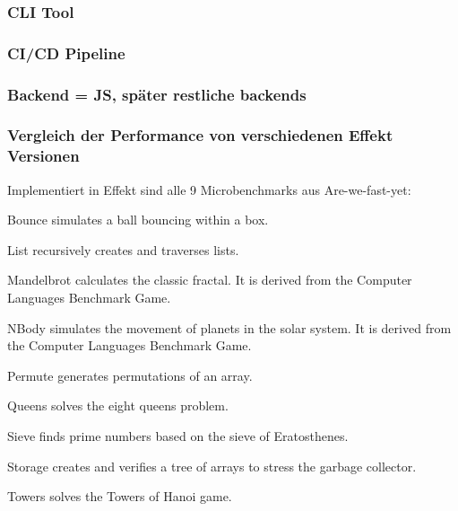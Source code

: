\subsubsection{ CLI Tool }
\subsubsection{CI/CD Pipeline }
\subsubsection{ Backend = JS, später restliche backends }
\subsubsection{ Vergleich der Performance von verschiedenen Effekt Versionen }

    Implementiert in Effekt sind alle 9 Microbenchmarks aus Are-we-fast-yet:

        Bounce simulates a ball bouncing within a box.

        List recursively creates and traverses lists.

        Mandelbrot calculates the classic fractal. It is derived from the Computer Languages Benchmark Game.

        NBody simulates the movement of planets in the solar system. It is derived from the Computer Languages Benchmark Game.

        Permute generates permutations of an array.

        Queens solves the eight queens problem.

        Sieve finds prime numbers based on the sieve of Eratosthenes.

        Storage creates and verifies a tree of arrays to stress the garbage collector.

        Towers solves the Towers of Hanoi game.
        
